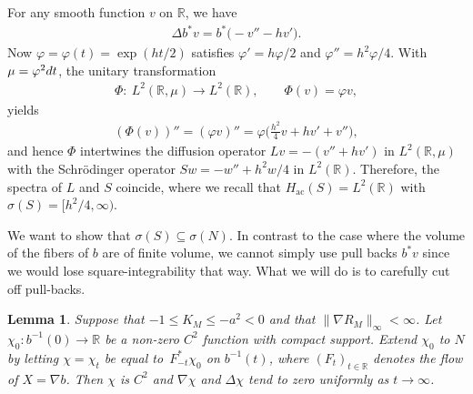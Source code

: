 \documentclass[11pt]{article}
\numberwithin{equation}{section}
\numberwithin{equation}{section}
\newtheorem{Lemma}[Theorem]{Lemma}
\def\ac{\mathrm{ac}}
\def\R{\mathbb R}
\def\vf{\varphi}
\begin{document}
For any smooth function $v$ on $\R$, we have
\begin{align*}
	\Delta b^*v = b^*\bigl(-v'' - hv'\bigr).
\end{align*}
Now $\vf=\vf(t)=\exp(ht/2)$ satisfies $\vf'=h\vf/2$ and $\vf''=h^2\vf/4$.
With $\mu=\vf^2{\rm d}t$, the unitary transformation
\begin{align*}
	\Phi \colon \ L^2(\R,\mu) \to L^2(\R), \qquad \Phi(v) = \vf v,
\end{align*}
yields
\begin{align*}
	(\Phi(v))'' = (\vf v)'' = \vf\biggl(\frac{h^2}4v + hv' + v''\biggr),
\end{align*}
and hence $\Phi$ intertwines the diffusion operator $Lv=-(v''+hv')$ in $L^2(\R,\mu)$
with the Schr\"odinger operator $Sw=-w''+h^2w/4$ in $L^2(\R)$.
Therefore, the spectra of $L$ and $S$ coincide,
where we recall that $H_{\ac}(S)=L^2(\R)$ with $\sigma(S)=\bigl[h^2/4,\infty\bigr)$.

We want to show that $\sigma(S)\subseteq\sigma(N)$.
In contrast to the case where the volume of the fibers of $b$ are of finite volume,
we cannot simply use pull backs $b^*v$ since we would lose square-integrability that way.
What we will do is to carefully cut off pull-backs.

\begin{Lemma}
Suppose that $-1\le K_M\le-a^2<0$ and that $\|\nabla R_M\|_\infty<\infty$.
Let $\chi_0\colon b^{-1}(0)\to\R$ be a non-zero $C^2$ function with compact support.
Extend $\chi_0$ to $N$ by letting $\chi=\chi_t$ be equal to~$F_{-t}^*\chi_0$ on $b^{-1}(t)$,
where $(F_t)_{t\in\R}$ denotes the flow of $X=\nabla b$.
Then $\chi$ is $C^2$ and $\nabla\chi$ and $\Delta\chi$ tend to zero uniformly as $t\to\infty$.
\end{Lemma}
\end{document}
